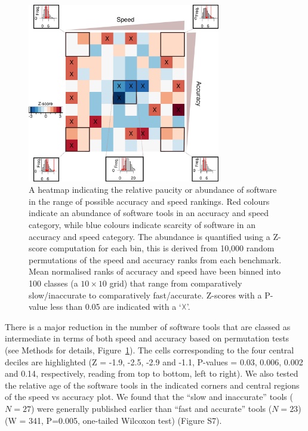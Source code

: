 \documentclass[fleqn,10pt]{SelfArx} %
\begin{document}

\begin{figure}[htb!]
\centering
\includegraphics[width=0.75\textwidth]{figure2.pdf}
\caption{A heatmap indicating the relative paucity or abundance of
  software in the range of possible accuracy and speed rankings. Red
  colours indicate an abundance of software tools in an accuracy and
  speed category, while blue colours indicate scarcity of software in
  an accuracy and speed category. The abundance is quantified using a
  Z-score computation for each bin, this is derived from 10,000 random
  permutations of the speed and accuracy ranks from each
  benchmark. Mean normalised ranks of accuracy and speed have been
  binned into 100 classes (a $10\times10$ grid) that range from
  comparatively slow/inaccurate to comparatively
  fast/accurate. Z-scores with a P-value less than 0.05 are indicated
  with a ‘$\vartimes$’.}
\label{fig:speedaccuracy}
\end{figure}

There is a major reduction in the number of software tools that are
classed as intermediate in terms of both speed and accuracy based on
permutation tests (see Methods for details, Figure~\ref{fig:speedaccuracy}). The cells
corresponding to the four central deciles are
highlighted {\color{black}(Z = -1.9, -2.5, -2.9 and -1.1, P-values = 0.03, 0.006,
0.002 and 0.14}, respectively, reading from top to bottom, left to
right). We also tested the relative age of the software tools in
the indicated corners and central regions of the speed vs
accuracy plot. We found that the “slow and inaccurate” tools ($N=27$) were
generally published earlier than ``fast and accurate'' tools ($N=23$) {\color{black}(W = 341, P=0.005,
one-tailed Wilcoxon test)} (Figure S7).
\end{document}

